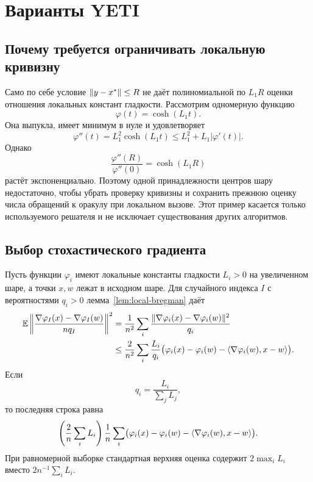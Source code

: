 \section{Варианты YETI}
\label{app:variants}

\subsection{Почему требуется ограничивать локальную кривизну}

Само по себе условие $\lVert y-x^\ast\rVert\le R$ не даёт полиномиальной
по $L_1R$ оценки отношения локальных констант гладкости.
Рассмотрим одномерную функцию
\[
 \varphi(t)=\cosh(L_1t).
\]
Она выпукла, имеет минимум в нуле и удовлетворяет
\[
 \varphi''(t)=L_1^2\cosh(L_1t)
 \le L_1^2+L_1|\varphi'(t)|.
\]
Однако
\[
 \frac{\varphi''(R)}{\varphi''(0)}=\cosh(L_1R)
\]
растёт экспоненциально. Поэтому одной принадлежности центров шару
недостаточно, чтобы убрать проверку кривизны и сохранить прежнюю
оценку числа обращений к оракулу при локальном вызове. Этот пример касается только используемого
решателя и не исключает существования других алгоритмов.

\subsection{Выбор стохастического градиента}

Пусть функции $\varphi_i$ имеют локальные константы гладкости $L_i>0$
на увеличенном шаре, а точки $x,w$ лежат в исходном шаре.
Для случайного индекса $I$ с вероятностями $q_i>0$
лемма~\ref{lem:local-bregman} даёт
\begin{equation}\label{eq:importance-variance}
 \begin{aligned}
 \mathbb E\left\|
 \frac{\nabla\varphi_I(x)-\nabla\varphi_I(w)}{nq_I}
 \right\|^2&=\frac1{n^2}\sum_i
       \frac{\lVert\nabla\varphi_i(x)-\nabla\varphi_i(w)\rVert^2}{q_i}
 \\&\le\frac2{n^2}\sum_i\frac{L_i}{q_i}
       \bigl(\varphi_i(x)-\varphi_i(w)
                  -\langle \nabla\varphi_i(w),x-w\rangle\bigr).
 \end{aligned}
\end{equation}
Если
\[
 q_i=\frac{L_i}{\sum_jL_j},
\]
то последняя строка равна
\[
 \left(\frac2n\sum_iL_i\right)\frac1n\sum_i
 \bigl(\varphi_i(x)-\varphi_i(w)-\langle \nabla\varphi_i(w),x-w\rangle\bigr).
\]
При равномерной выборке стандартная верхняя оценка содержит
$2\max_iL_i$ вместо $2n^{-1}\sum_iL_i$.

